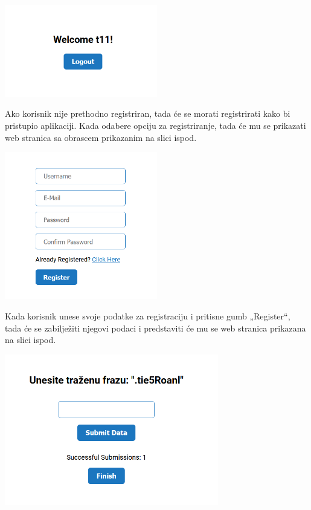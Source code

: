 \documentclass[]{foi}
\begin{document}
\begin{center}
    \includegraphics[width=0.5\textwidth]{slike/app_welcome.png}
    \label{fig:app-welcome}
\end{center}

Ako korisnik nije prethodno registriran, tada će se morati registrirati kako bi pristupio aplikaciji. Kada odabere opciju za registriranje, tada će mu se prikazati web stranica sa obrascem prikazanim na slici ispod.

\begin{center}
    \includegraphics[width=0.5\textwidth]{slike/app_register.png}
    \label{fig:app-register}
\end{center}

Kada korisnik unese svoje podatke za registraciju i pritisne gumb „Register“, tada će se zabilježiti njegovi podaci i predstaviti će mu se web stranica prikazana na slici ispod.

\begin{center}
    \includegraphics[width=0.7\textwidth]{slike/app_tipkanje.png}
    \label{fig:app-tipkanje}
\end{center}
\end{document}
